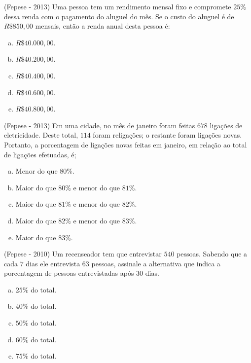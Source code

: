     \begin{exer} (Fepese - 2013) Uma pessoa tem um rendimento mensal fixo e compromete $25\%$ dessa renda com o pagamento do aluguel do mês. Se o custo do aluguel é de $R\$850,00$ mensais, então a renda anual desta pessoa é:
    \begin{enumerate}[a)]
    \item $R\$ 40.000,00$.
    \item $R\$ 40.200,00$.
    \item $R\$ 40.400,00$.
    \item $R\$ 40.600,00$.
    \item $R\$ 40.800,00$.
    \end{enumerate}
    \end{exer}

    \begin{exer} (Fepese - 2013)  Em uma cidade, no mês de janeiro foram feitas $678$ ligações de eletricidade. Deste total, $114$ foram religações; o restante foram ligações novas. Portanto, a porcentagem de ligações novas feitas em janeiro, em relação ao total de ligações efetuadas, é;
    \begin{enumerate}[a)]
    \item Menor do que $80\%$.
    \item Maior do que $80\%$ e menor do que $81\%$.
    \item Maior do que $81\%$ e menor do que $82\%$.
    \item Maior do que $82\%$ e menor do que $83\%$.
    \item Maior do que $83\%$.
    \end{enumerate}
    \end{exer}


    \begin{exer} (Fepese - 2010) Um recenseador tem que entrevistar $540$ pessoas. Sabendo que a cada $7$ dias ele entrevista $63$ pessoas, assinale a alternativa que indica a porcentagem de pessoas entrevistadas após $30$ dias.
    \begin{enumerate}[a)]
    \item $25\%$ do total.
    \item $40\%$ do total.
    \item $50\%$ do total.
    \item $60\%$ do total.
    \item $75\%$ do total.
    \end{enumerate}
    \end{exer}

